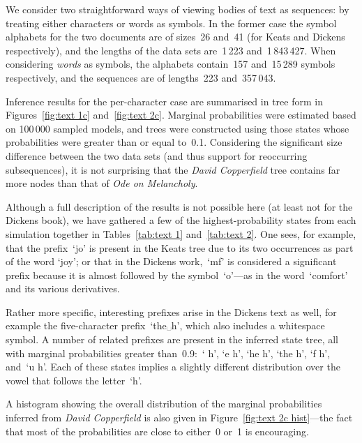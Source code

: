 \documentclass[12pt,a4paper]{article}
\begin{document}
We consider two straightforward ways of viewing bodies of text as sequences: by
treating either characters or words as symbols. In the former case the symbol
alphabets for the two documents are of sizes~26 and~41 (for Keats and Dickens
respectively), and the lengths of the data sets are~1\,223 and~1\,843\,427. When
considering \emph{words} as symbols, the alphabets contain~157 and~15\,289
symbols respectively, and the sequences are of lengths~223 and~357\,043.

Inference results for the per-character case are summarised in tree form in
Figures~\ref{fig:text 1c} and~\ref{fig:text 2c}. Marginal probabilities were
estimated based on 100\,000 sampled models, and trees were constructed using
those states whose probabilities were greater than or equal to~0.1. Considering
the significant size difference between the two data sets (and thus support for
reoccurring subsequences), it is not surprising that the \textit{David
Copperfield} tree contains far more nodes than that of \textit{Ode on
Melancholy}.

Although a full description of the results is not possible here (at least not
for the Dickens book), we have gathered a few of the highest-probability states
from each simulation together in Tables~\ref{tab:text 1} and~\ref{tab:text 2}.
One sees, for example, that the prefix~`jo' is present in the Keats tree due to
its two occurrences as part of the word `joy'; or that in the Dickens work,~`mf'
is considered a significant prefix because it is almost followed by the
symbol~`o'---as in the word~`comfort' and its various derivatives.

Rather more specific, interesting prefixes arise in the Dickens text as well,
for example the five-character prefix~`the␣h', which also includes a whitespace
symbol. A number of related prefixes are present in the inferred state tree, all
with marginal probabilities greater than~0.9:~` h', `e h', `he h', `the h',
`f h', and~`u h'. Each of these states implies a slightly different distribution
over the vowel that follows the letter~`h'.

A histogram showing the overall distribution of the marginal probabilities
inferred from \textit{David Copperfield} is also given in Figure~\ref{fig:text
2c hist}---the fact that most of the probabilities are close to either~0 or~1 is
encouraging.
\end{document}
